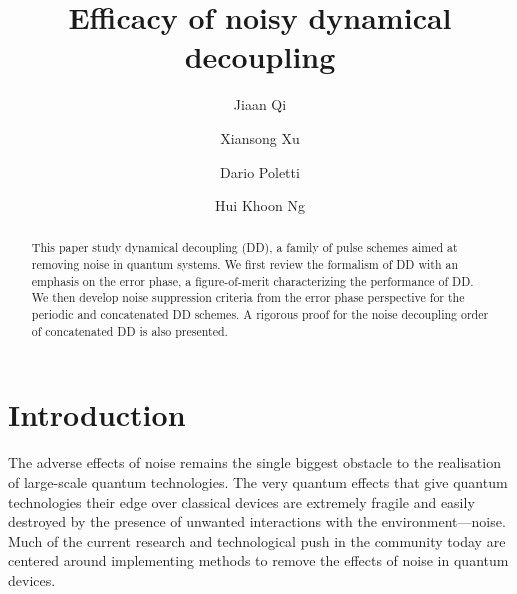 \documentclass[pra,reprint,superscriptaddress]{revtex4-2}
\begin{document}
\title{Efficacy of noisy dynamical decoupling}
\author{Jiaan Qi}

\author{Xiansong Xu}
\author{Dario Poletti}
\author{Hui Khoon Ng}


\begin{abstract}
This paper study dynamical decoupling (DD), a family of pulse schemes aimed at removing noise in quantum systems. We first review the formalism of DD with an emphasis on the error phase, a figure-of-merit characterizing the performance of DD. We then develop noise suppression criteria from the error phase perspective for the periodic and concatenated DD schemes. A rigorous proof for the noise decoupling order of  concatenated DD is also presented.
\end{abstract}

\maketitle




\section{Introduction}
The adverse effects of noise remains the single biggest obstacle to the realisation of large-scale quantum technologies. The very quantum effects that give quantum technologies their edge over classical devices are extremely fragile and easily destroyed by the presence of unwanted interactions with the environment—noise. Much of the current research and technological push in the community today are centered around implementing methods to remove the effects of noise in quantum devices.
\end{document}

